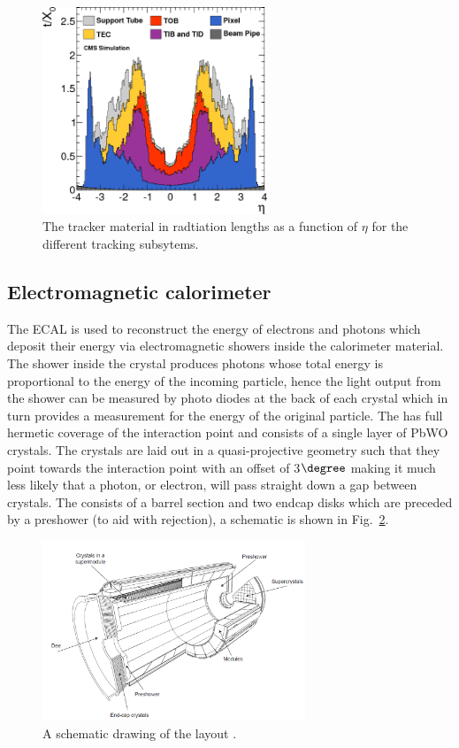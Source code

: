 \begin{figure}
  \includegraphics[width=0.6\textwidth]{ch2_cms_exp/plots/tracker_material.png}
  \caption[CMS tracker material budget]{The \CMS tracker material in radtiation lengths as a function of $\eta$ for the different tracking subsytems.}
  \label{fig:tracker_material}
\end{figure}

\subsection{Electromagnetic calorimeter}

The \acf{ECAL} is used to reconstruct the energy of electrons and photons which deposit their energy via electromagnetic showers inside the calorimeter material. The shower inside the crystal produces photons whose total energy is proportional to the energy of the incoming particle, hence the light output from the shower can be measured by photo diodes at the back of each crystal which in turn provides a measurement for the energy of the original particle. The \ECAL has full hermetic coverage of the interaction point and consists of a single layer of \acf{PbWO} crystals. The crystals are laid out in a quasi-projective geometry such that they point towards the interaction point with an offset of 3$\degree$ making it much less likely that a photon, or electron, will pass straight down a gap between crystals. The \ECAL consists of a barrel section and two endcap disks which are preceded by a preshower (to aid with \pizero rejection), a schematic is shown in Fig.~\ref{fig:cms_ecal}.

\begin{figure}
  \includegraphics[width=0.7\textwidth]{ch2_cms_exp/plots/cmsecal.png}
  \caption[CMS ECAL schematic]{A schematic drawing of the \CMS \ECAL layout .}
  \label{fig:cms_ecal}
\end{figure}

